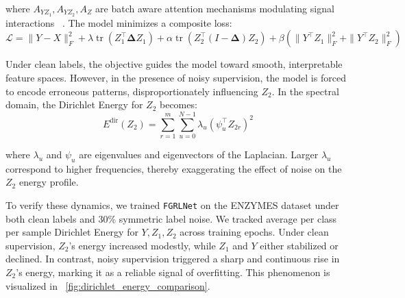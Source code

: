 where \( A_{YZ_1}, A_{YZ_2}, A_Z \) are batch aware attention mechanisms modulating signal interactions ~\cite{hlffgnn}. The model minimizes a composite loss:
\[
\mathcal{L} = \|Y - X\|_F^2 + \lambda \operatorname{tr}(Z_1^\top \mathbf{\Delta} Z_1) + \alpha \operatorname{tr}(Z_2^\top (I - \mathbf{\Delta}) Z_2) + \beta (\|Y^\top Z_1\|_F^2 + \|Y^\top Z_2\|_F^2)
\]

Under clean labels, the objective guides the model toward smooth, interpretable feature spaces. However, in the presence of noisy supervision, the model is forced to encode erroneous patterns, disproportionately influencing \( Z_2 \). In the spectral domain, the Dirichlet Energy for \( Z_2 \) becomes:
\[
E^{\text{dir}}(Z_2) = \sum_{r=1}^m \sum_{u=0}^{N-1} \lambda_u (\psi_u^\top Z_{2r})^2
\]

where \( \lambda_u \) and \( \psi_u \) are eigenvalues and eigenvectors of the Laplacian. Larger \( \lambda_u \) correspond to higher frequencies, thereby exaggerating the effect of noise on the \( Z_2 \) energy profile.

To verify these dynamics, we trained \texttt{FGRLNet} on the ENZYMES dataset under both clean labels and 30\% symmetric label noise. We tracked average per class per sample Dirichlet Energy for \( Y, Z_1, Z_2 \) across training epochs. Under clean supervision, \( Z_2 \)'s energy increased modestly, while \( Z_1 \) and \( Y \) either stabilized or declined. In contrast, noisy supervision triggered a sharp and continuous rise in \( Z_2 \)'s energy, marking it as a reliable signal of overfitting. This phenomenon is visualized in ~\ref{fig:dirichlet_energy_comparison}.



